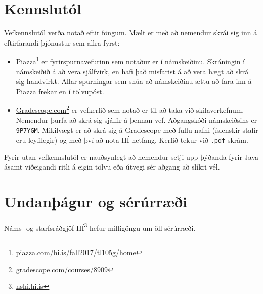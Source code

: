 \documentclass[justified, nobib]{tufte-handout}
\begin{document}
\section{Kennslutól}
\label{sec:tools}
Vefkennslutól verða notað eftir föngum. Mælt er með að nemendur skrái sig inn á eftirfarandi þjónustur sem allra fyrst:
\begin{itemize}
 \item \href{piazza.com/hi.is/fall2017/tl105g/home}{Piazza}\footnote{\url{piazza.com/hi.is/fall2017/tl105g/home}} er fyrirspurnavefurinn sem notaður er í námskeiðinu. Skráningin í námskeiðið á að vera sjálfvirk, en hafi það misfarist á að vera hægt að skrá sig handvirkt. Allar spurningar sem snúa að námskeiðinu ættu að fara inn á Piazza frekar en í tölvupóst.
 \item \href{https://gradescope.com/courses/8909}{Gradescope.com}\footnote{\url{gradescope.com/courses/8909}} er vefkerfið sem notað er til að taka við skilaverkefnum. Nemendur þurfa að skrá sig sjálfir á þennan vef. Aðgangskóði námskeiðsins er \texttt{9P7YGM}. Mikilvægt er að skrá sig á Gradescope með fullu nafni (íslenskir stafir eru leyfilegir) og með því að nota HÍ-netfang. Kerfið tekur við \texttt{.pdf} skrám.
\end{itemize}
Fyrir utan vefkennslutól er nauðsynlegt að nemendur setji upp þýðanda fyrir Java ásamt viðeigandi ritli á eigin tölvu eða útvegi sér aðgang að slíkri vél.

\section{Undanþágur og sérúrræði}
\href{http://nshi.hi.is/}{Náms- og starfsráðgjöf HÍ}\footnote{\url{nshi.hi.is}} hefur milligöngu um öll sérúrræði.
\end{document}
